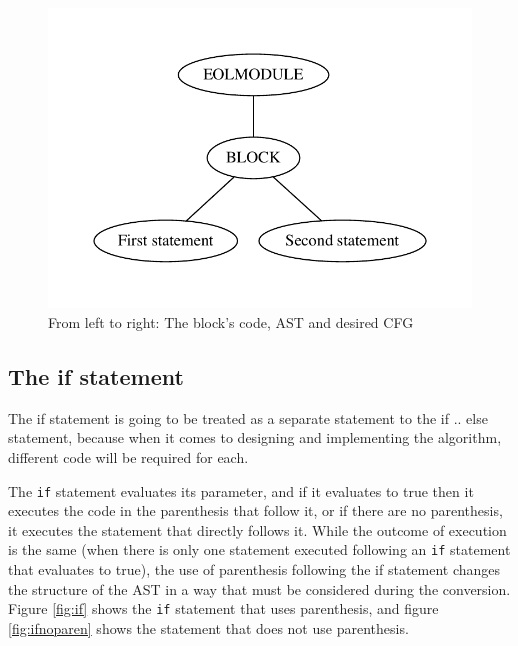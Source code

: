 \begin{figure}
\centering
\begin{minipage}{.3\textwidth}
  \centering
  
\end{minipage}%
\begin{minipage}{.3\textwidth}
  \centering
  \includegraphics[width=\linewidth]{figures/statements/block_AST.pdf}
\end{minipage}
\begin{minipage}{.3\textwidth}
  \centering
\end{minipage}
\caption{From left to right: The block's code, AST and desired CFG}
\label{fig:block}
\end{figure}

\subsection{The if statement}

The if statement is going to be treated as a separate statement to the if .. else statement, because when it comes to designing and implementing the algorithm, different code will be required for each.

The \verb|if| statement evaluates its parameter, and if it evaluates to true then it executes the code in the parenthesis that follow it, or if there are no parenthesis, it executes the statement that directly follows it. While the outcome of execution is the same (when there is only one statement executed following an \verb|if| statement that evaluates to true), the use of parenthesis following the if statement changes the structure of the AST in a way that must be considered during the conversion. Figure \ref{fig:if} shows the \verb|if| statement that uses parenthesis, and figure \ref{fig:ifnoparen} shows the statement that does not use parenthesis.

